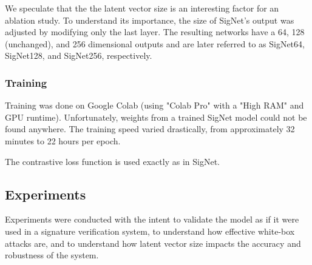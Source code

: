 
We speculate that the the latent vector size is an interesting factor for an ablation study.
To understand its importance, the size of SigNet's output was adjusted by modifying only the last layer.
The resulting networks have a 64, 128 (unchanged), and 256 dimensional outputs and are later referred to as SigNet64, SigNet128, and SigNet256, respectively.

\subsubsection{Training}
Training was done on Google Colab (using "Colab Pro" with a "High RAM" and GPU runtime).
Unfortunately, weights from a trained SigNet model could not be found anywhere.
The training speed varied drastically, from approximately 32 minutes to 22 hours per epoch.




The contrastive loss function is used exactly as in SigNet\cite{GitHub_sounakdey}.


\subsection{Experiments}

Experiments were conducted with the intent to validate the model as if it were used in a signature verification system, to understand how effective white-box attacks are, and to understand how latent vector size impacts the accuracy and robustness of the system.


